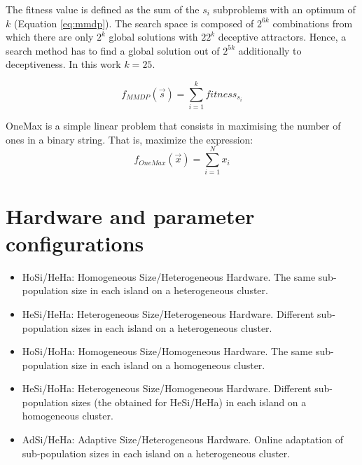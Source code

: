 The fitness value is defined as the sum of the $s_i$ subproblems with an optimum of $k$ (Equation \ref{eq:mmdp}).
The search space is composed of $2^{6k}$ combinations from which there
are only $2^k$ global solutions with $22^k$ deceptive
attractors. Hence, a search method has to find a global solution
out of $2^{5k}$ additionally to deceptiveness. In this work $k=25$. %

\begin{equation}\label{eq:mmdp}
f_{MMDP}(\vec s)= \sum_{i=1}^{k} fitness_{s_i}
\end{equation}

OneMax is a simple linear problem  %
that consists in maximising the number of ones in a binary string. That is, maximize the expression:
\begin{equation}
f_{OneMax}(\vec{x}) = \sum_{i=1}^{N}{x_{i}}
\end{equation}

\section{Hardware and parameter configurations}


\begin{itemize}
\item HoSi/HeHa: Homogeneous Size/Heterogeneous Hardware. The same sub-population size in each island on a heterogeneous cluster.
\item HeSi/HeHa: Heterogeneous Size/Heterogeneous Hardware. Different
  sub-population sizes in each island on a heterogeneous cluster. %
\item HoSi/HoHa: Homogeneous Size/Homogeneous Hardware. The same
  sub-population size in each island on a homogeneous cluster. %
\item HeSi/HoHa: Heterogeneous Size/Homogeneous Hardware. Different sub-population sizes (the obtained for HeSi/HeHa) in each island on a homogeneous cluster.

\item AdSi/HeHa: Adaptive Size/Heterogeneous Hardware. Online adaptation of sub-population sizes in each island on a heterogeneous cluster.
\end{itemize} %

